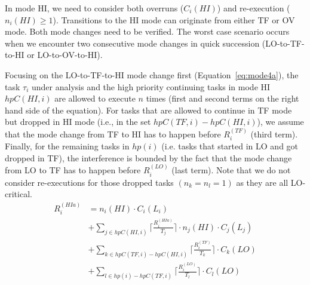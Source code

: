 \documentclass[conference]{IEEEtran}
\begin{document}
In mode HI, we need to consider both overruns ($C_i(HI)$) and re-execution ($n_i(HI) \ge 1$). Transitions to the HI mode can originate from either TF or OV mode. Both mode changes need to be verified. The worst case scenario occurs when we encounter two consecutive mode changes in quick succession (LO-to-TF-to-HI or LO-to-OV-to-HI).

Focusing on the LO-to-TF-to-HI mode change first (Equation~\eqref{eq:mode4a}), the task $\tau_i$ under analysis and the high priority continuing tasks in mode HI $hpC(HI, i)$ are allowed to execute $n$ times (first and second terms on the right hand side of the equation). For tasks that are allowed to continue in TF mode but dropped in HI mode (i.e., in the set $hpC(TF,i)-hpC(HI,i)$), we assume that the mode change from TF to HI has to happen before $R_i^{(TF)}$ (third term). Finally, for the remaining tasks in $hp(i)$ (i.e. tasks that started in LO and got dropped in TF), the interference is bounded by the fact that the mode change from LO to TF has to happen before $R_i^{(LO)}$ (last term). Note that we do not consider re-executions for those dropped tasks $(n_k=n_l=1)$ as they are all LO-critical.
%
\begin{equation}\label{eq:mode4a}
\begin{aligned}
R_i^{(HIa)} & = n_i(HI) \cdot C_i(L_i) \\
&  +\sum_{j \in hpC(HI,i)}\Big\lceil\frac{R_i^{(HIa)}}{T_j}\Big\rceil \cdot n_j(HI) \cdot C_j(L_j) \\
&  +\sum_{k \in hpC(TF,i)-hpC(HI,i)}\Big\lceil\frac{R_i^{(TF)}}{T_k}\Big\rceil \cdot C_k(LO)\\
&  +\sum_{l \in hp(i)-hpC(TF,i)}\Big\lceil\frac{R_i^{(LO)}}{T_l}\Big\rceil \cdot C_l(LO)
\end{aligned}
\end{equation}
\end{document}
